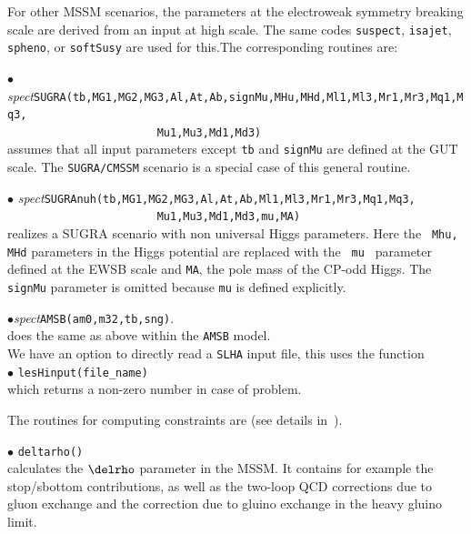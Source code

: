 \documentclass[12pt,a4paper]{article}
\begin{document}
{For other MSSM scenarios, the   parameters at the electroweak symmetry breaking scale are derived from 
an  input at high scale. The same codes {\tt suspect}, {\tt isajet},
{\tt spheno}, or {\tt softSusy} are used for this.The corresponding
routines are:

\noindent $\bullet$ {\it
spect}\verb|SUGRA(tb,MG1,MG2,MG3,Al,At,Ab,signMu,MHu,MHd,Ml1,Ml3,Mr1,Mr3,Mq1,Mq3,|\\
\verb|                       Mu1,Mu3,Md1,Md3)|\\
assumes that  all input parameters except {\tt tb} and {\tt signMu}  are
defined at the GUT scale. The {\tt SUGRA/CMSSM} scenario is a special case of this general routine. 

\noindent $\bullet$ {\it
spect}\verb|SUGRAnuh(tb,MG1,MG2,MG3,Al,At,Ab,Ml1,Ml3,Mr1,Mr3,Mq1,Mq3,|\\
\verb|                       Mu1,Mu3,Md1,Md3,mu,MA)|\\
realizes a SUGRA scenario with non universal Higgs parameters. Here the {\tt
Mhu, MHd} parameters in the Higgs potential are replaced with the {\tt
mu } parameter defined at the  EWSB scale and {\tt MA}, the pole mass of the CP-odd Higgs. The
{\tt signMu} parameter is omitted  because {\tt mu} is defined
explicitly.

\noindent
$\bullet${\it spect}\verb|AMSB(am0,m32,tb,sng)|.\\
does  the same as above within the {\tt AMSB} model.\\



We  have an option to directly read a {\tt SLHA}  input file, this uses the  function \\
\noi$\bullet$ \verb|lesHinput(file_name) |\\
which returns a non-zero number in case of problem.

The routines for computing constraints are (see details
in~\cite{Belanger:2004yn}).

\noi$\bullet$ \verb|deltarho()|\\
 calculates  the $\delrho$ parameter in the MSSM.  It contains for example the 
stop/sbottom contributions, as well as the two-loop QCD
corrections due to gluon exchange and the correction due to gluino
exchange in the heavy gluino limit.

}
\end{document}
